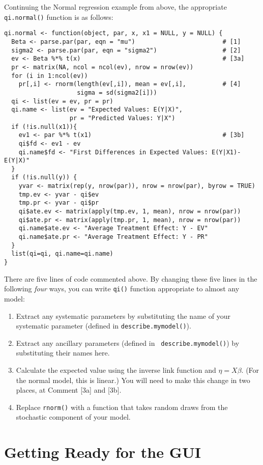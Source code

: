 Continuing the Normal regression example from above, the appropriate {\tt
  qi.normal()} function is as follows:  
\begin{verbatim}
qi.normal <- function(object, par, x, x1 = NULL, y = NULL) {
  Beta <- parse.par(par, eqn = "mu")                        # [1]
  sigma2 <- parse.par(par, eqn = "sigma2")                  # [2]
  ev <- Beta %*% t(x)                                       # [3a]
  pr <- matrix(NA, ncol = ncol(ev), nrow = nrow(ev))
  for (i in 1:ncol(ev))                                           
    pr[,i] <- rnorm(length(ev[,i]), mean = ev[,i],          # [4]
                    sigma = sd(sigma2[i]))
  qi <- list(ev = ev, pr = pr)
  qi.name <- list(ev = "Expected Values: E(Y|X)",
                  pr = "Predicted Values: Y|X")
  if (!is.null(x1)){
    ev1 <- par %*% t(x1)                                    # [3b]
    qi$fd <- ev1 - ev
    qi.name$fd <- "First Differences in Expected Values: E(Y|X1)-E(Y|X)"
  }
  if (!is.null(y)) {
    yvar <- matrix(rep(y, nrow(par)), nrow = nrow(par), byrow = TRUE)
    tmp.ev <- yvar - qi$ev
    tmp.pr <- yvar - qi$pr
    qi$ate.ev <- matrix(apply(tmp.ev, 1, mean), nrow = nrow(par))
    qi$ate.pr <- matrix(apply(tmp.pr, 1, mean), nrow = nrow(par))
    qi.name$ate.ev <- "Average Treatment Effect: Y - EV"
    qi.name$ate.pr <- "Average Treatment Effect: Y - PR"
  }
  list(qi=qi, qi.name=qi.name)
}
\end{verbatim}
There are five lines of code commented above.  By changing these five
lines in the following \emph{four} ways, you can write {\tt qi()}
function appropriate to almost any model:  
\begin{enumerate}  
\item Extract any systematic parameters by substituting the name of
your systematic parameter (defined in {\tt describe.mymodel()}).   
\item Extract any ancillary parameters (defined in {\tt
describe.mymodel()}) by substituting their names
here.  
\item Calculate the expected value using the inverse link function and
$\eta = X \beta$.  (For the normal model, this is linear.)  You will
need to make this change in two places, at Comment [3a] and [3b].  
\item Replace {\tt rnorm()} with a function that takes random draws
from the stochastic component of your model.  
\end{enumerate}

\section{Getting Ready for the GUI}  

